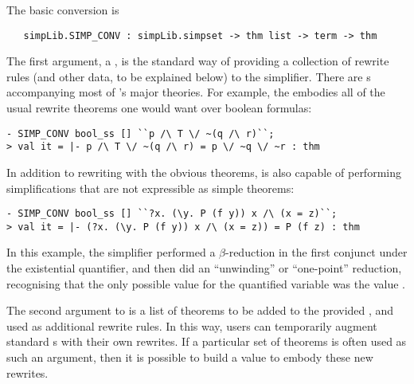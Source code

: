 {The basic conversion is
\begin{hol}
\begin{verbatim}
   simpLib.SIMP_CONV : simpLib.simpset -> thm list -> term -> thm
\end{verbatim}
\end{hol}
The first argument, a \simpset, is the standard way of providing a
collection of rewrite rules (and other data, to be explained below) to
the simplifier.  There are \simpset{}s accompanying most of \HOL's
major theories.  For example, the \simpset{} 
embodies all of the usual rewrite theorems one would want over boolean
formulas:
\setcounter{sessioncount}{0}
\begin{session}
\begin{hol}
\begin{verbatim}
- SIMP_CONV bool_ss [] ``p /\ T \/ ~(q /\ r)``;
> val it = |- p /\ T \/ ~(q /\ r) = p \/ ~q \/ ~r : thm
\end{verbatim}
\end{hol}
\end{session}
In addition to rewriting with the obvious theorems,  is
also capable of performing simplifications that are not expressible as
simple theorems:
\begin{session}
\begin{hol}
\begin{verbatim}
- SIMP_CONV bool_ss [] ``?x. (\y. P (f y)) x /\ (x = z)``;
> val it = |- (?x. (\y. P (f y)) x /\ (x = z)) = P (f z) : thm
\end{verbatim}
\end{hol}
\end{session}
In this example, the simplifier performed a $\beta$-reduction in the
first conjunct under the existential quantifier, and then did an
``unwinding'' or ``one-point'' reduction, recognising that the only
possible value for the quantified variable  was the value
.

The second argument to  is a list of theorems to be
added to the provided \simpset, and used as additional rewrite rules.
In this way, users can temporarily augment standard \simpset{}s with
their own rewrites.  If a particular set of theorems is often used as
such an argument, then it is possible to build a \simpset{} value to
embody these new rewrites.

}
